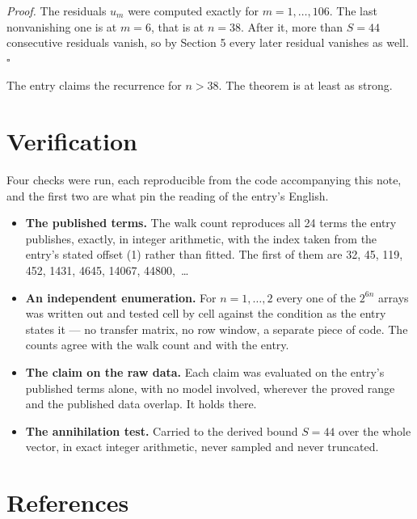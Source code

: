\documentclass[11pt]{article}
\theoremstyle{definition}
\begin{document}
{\itshape Proof.} The residuals $u_m$ were computed exactly for $m = 1,\dots,106$. The last nonvanishing one is at $m = 6$, that is at $n = 38$. After it, more than $S = 44$ consecutive residuals vanish, so by Section 5 every later residual vanishes as well. $\square$

The entry claims the recurrence for $n > 38$. The theorem is at least as strong.

\section{Verification}

Four checks were run, each reproducible from the code accompanying this note, and the first two are what pin the reading of the entry's English.

\begin{itemize}

\item {\bfseries The published terms.} The walk count reproduces all 24 terms the entry publishes, exactly, in integer arithmetic, with the index taken from the entry's stated offset (1) rather than fitted. The first of them are 32, 45, 119, 452, 1431, 4645, 14067, 44800,~\dots

\item {\bfseries An independent enumeration.} For $n = 1,\dots,2$ every one of the $2^{6n}$ arrays was written out and tested cell by cell against the condition as the entry states it --- no transfer matrix, no row window, a separate piece of code. The counts agree with the walk count and with the entry.

\item {\bfseries The claim on the raw data.} Each claim was evaluated on the entry's published terms alone, with no model involved, wherever the proved range and the published data overlap. It holds there.

\item {\bfseries The annihilation test.} Carried to the derived bound $S = 44$ over the whole vector, in exact integer arithmetic, never sampled and never truncated.

\end{itemize}

\section{References}
\end{document}
